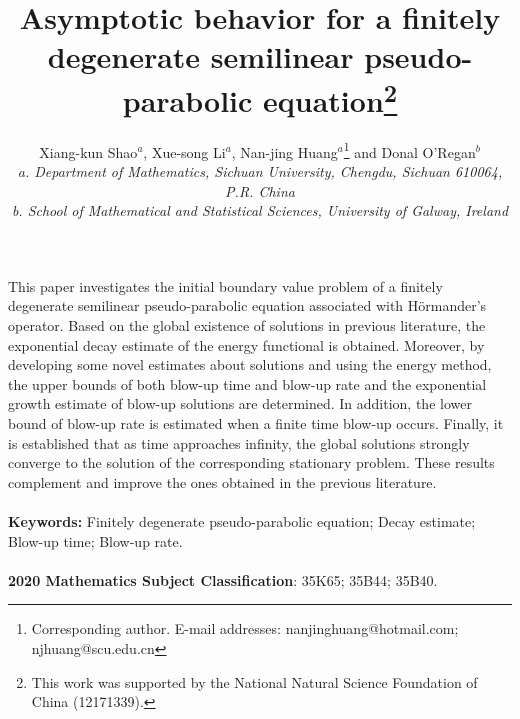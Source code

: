 \documentclass[11pt,a4paper]{article}
\numberwithin{equation}{section}
\numberwithin{remark}{section}
\begin{document}
\title{{\Large \bf Asymptotic behavior for a finitely degenerate semilinear pseudo-parabolic equation}\thanks{This work was supported by the National Natural Science Foundation of China (12171339).}}
\author{Xiang-kun Shao$^a$, Xue-song Li$^a$, Nan-jing Huang$^a $\footnote{Corresponding author.  E-mail addresses: nanjinghuang@hotmail.com; njhuang@scu.edu.cn} and Donal O'Regan$^b$\\
{\small\it a. Department of Mathematics, Sichuan University, Chengdu, Sichuan 610064, P.R. China}\\
{\small\it b. School of Mathematical and  Statistical Sciences,  University of Galway, Ireland}}
\date{}
\maketitle
\begin{center}
\begin{minipage}{5.5in}
 This paper investigates the initial boundary value problem of a finitely degenerate semilinear pseudo-parabolic equation associated with H\"{o}rmander's operator. Based on the global existence of solutions in previous literature, the exponential decay estimate of the energy functional is obtained. Moreover, by developing some novel estimates about solutions and using the energy method, the upper bounds of both blow-up time and blow-up rate and the exponential growth estimate of blow-up solutions are determined. In addition, the lower bound of blow-up rate is estimated when a finite time blow-up occurs. Finally, it is established that as time approaches infinity, the global solutions strongly converge to the solution of the corresponding stationary problem. These results complement and improve the ones obtained in the previous literature.
\\ \ \\
{\bf Keywords:} Finitely degenerate pseudo-parabolic equation; Decay estimate; Blow-up time; Blow-up rate.
\\ \ \\
{\bf 2020 Mathematics Subject Classification}: 35K65; 35B44; 35B40.
\end{minipage}
\end{center}
\end{document}
